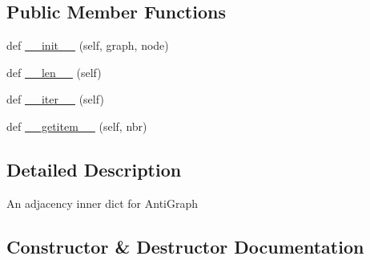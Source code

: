 \subsection*{Public Member Functions}
\begin{DoxyCompactItemize}
\item 
def \hyperlink{classnetworkx_1_1algorithms_1_1approximation_1_1kcomponents_1_1__AntiGraph_1_1AntiAtlasView_a0634ccadb606401c46de0d15d8e417b0}{\+\_\+\+\_\+init\+\_\+\+\_\+} (self, graph, node)
\item 
def \hyperlink{classnetworkx_1_1algorithms_1_1approximation_1_1kcomponents_1_1__AntiGraph_1_1AntiAtlasView_ac0cfdb64b2934527c2de0ba5ae23afd3}{\+\_\+\+\_\+len\+\_\+\+\_\+} (self)
\item 
def \hyperlink{classnetworkx_1_1algorithms_1_1approximation_1_1kcomponents_1_1__AntiGraph_1_1AntiAtlasView_a577a3c3e3ba055b102aa0bd8128404c0}{\+\_\+\+\_\+iter\+\_\+\+\_\+} (self)
\item 
def \hyperlink{classnetworkx_1_1algorithms_1_1approximation_1_1kcomponents_1_1__AntiGraph_1_1AntiAtlasView_af98e288aa9624cd656ad3dbd2d3af092}{\+\_\+\+\_\+getitem\+\_\+\+\_\+} (self, nbr)
\end{DoxyCompactItemize}


\subsection{Detailed Description}
\begin{DoxyVerb}An adjacency inner dict for AntiGraph\end{DoxyVerb}
 

\subsection{Constructor \& Destructor Documentation}
\mbox{\label{classnetworkx_1_1algorithms_1_1approximation_1_1kcomponents_1_1__AntiGraph_1_1AntiAtlasView_a0634ccadb606401c46de0d15d8e417b0}} 
